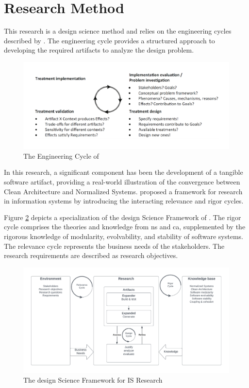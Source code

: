 \section{Research Method} \label{sec_research_method}

This research is a design science method and relies on the engineering cycles described
by \textcite{wieringa_design_2014}. The engineering cycle provides a structured approach
to developing the required artifacts to analyze the design problem.

\begin{figure}[H]
    \centering
    \includegraphics[width=1\textwidth]{figures/engineering_cycle.pdf}
    \caption[Engineering cycle]{The Engineering Cycle of \textcite{wieringa_design_2014}}
    \label{fig_engineering_cycle}
\end{figure}

In this research, a significant component has been the development of a tangible software
artifact, providing a real-world illustration of the convergence between Clean
Architecture and Normalized Systems. \textcite{hevner_design_2004} proposed a framework
for research in information systems by introducing the interacting relevance and rigor
cycles.

Figure \ref{fig_dsr} depicts a specialization of the design Science Framework of
\textcite{hevner_design_2004}. The rigor cycle comprises the theories and knowledge from
\gls{ns} and \gls{ca}, supplemented by the rigorous knowledge of modularity, evolvability,
and stability of software systems. The relevance cycle represents the business needs of
the stakeholders. The research requirements are described as research objectives.

\begin{figure}[H]
    \centering
    \includegraphics[width=1\textwidth]{figures/rigor_relevance_cycle.pdf}
    \caption[Design Science Framework for IS Research]{The design Science Framework for IS Research \parencite{hevner_design_2004}}
    \label{fig_dsr}
\end{figure}
